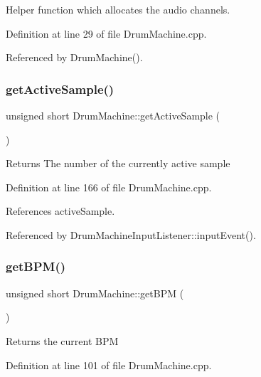 Helper function which allocates the audio channels. 



Definition at line 29 of file Drum\+Machine.\+cpp.



Referenced by Drum\+Machine().

\mbox{\label{class_drum_machine_ac8ef152a82bbce61bc1e2715c3e476b9}} 
\subsubsection{\texorpdfstring{get\+Active\+Sample()}{getActiveSample()}}
{\footnotesize\ttfamily unsigned short Drum\+Machine\+::get\+Active\+Sample (\begin{DoxyParamCaption}{ }\end{DoxyParamCaption})}

\begin{DoxyReturn}{Returns}
The number of the currently active sample 
\end{DoxyReturn}


Definition at line 166 of file Drum\+Machine.\+cpp.



References active\+Sample.



Referenced by Drum\+Machine\+Input\+Listener\+::input\+Event().

\mbox{\label{class_drum_machine_a9a7a34dca1803071fec5b6687cb98343}} 
\subsubsection{\texorpdfstring{get\+B\+P\+M()}{getBPM()}}
{\footnotesize\ttfamily unsigned short Drum\+Machine\+::get\+B\+PM (\begin{DoxyParamCaption}{ }\end{DoxyParamCaption})}

\begin{DoxyReturn}{Returns}
the current B\+PM 
\end{DoxyReturn}


Definition at line 101 of file Drum\+Machine.\+cpp.



